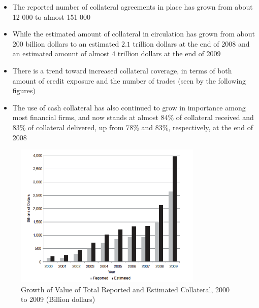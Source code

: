 \documentclass[11pt]{beamer}
\begin{document}
\begin{frame}
\begin{itemize}
\item The reported number of collateral agreements in place has grown from about 12 000 to almost 151 000
\item While the estimated amount of collateral in circulation has grown
from about $200$ billion dollars to an estimated $2.1$ trillion dollars at the end of 2008 and an estimated amount of almost $4$ trillion dollars at the end of 2009
\item There is a trend toward increased collateral coverage, in terms of both amount of credit exposure and the number of trades (seen by the following figures)
\item The use of cash collateral has also continued to grow in importance among most financial firms, and now stands
at almost 84\% of collateral received and 83\% of collateral delivered,
up from 78\% and 83\%, respectively, at the end of 2008
\end{itemize}
\end{frame}

\begin{frame}
\begin{figure}
\includegraphics[width=0.8\textwidth]{13_1.png}
\caption{Growth of Value of Total Reported and Estimated Collateral,
2000 to 2009 (Billion dollars)}
\end{figure}
\end{frame}
\end{document}

